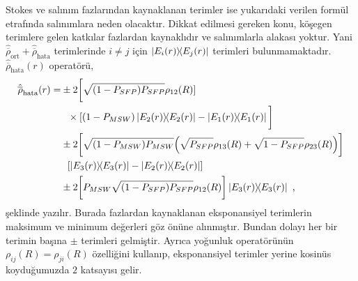 Stokes ve salınım fazlarından kaynaklanan terimler ise yukarıdaki verilen formül etrafında salınımlara neden olacaktır. Dikkat edilmesi gereken konu, köşegen terimlere gelen katkılar fazlardan kaynaklıdır ve salınımlarla alakası yoktur. Yani $ \hat{\overline{\rho}}_{\text{ort}}+ \hat{\overline{\rho}}_{\text{hata}} $ terimlerinde $ i \ne j$ için $ \dyad{E_{i}(r)}{E_{j}(r)} $ terimleri bulunmamaktadır. $ \hat{\overline{\rho}}_{\text{hata}}(r) $ operatörü,
\begin{align}\label{eqn:rhoBar_hata}
    \nonumber\hat{\overline{\rho}}_{\text{hata}}(r)=&\pm 2\bigg[\sqrt{(1-P_{SFP}) P_{SFP}}\rho_{12}(R)]\\
    \nonumber&~~\times[(1-P_{MSW})\dyad{E_{2}(r)}{E_{2}(r)} -\dyad{E_{1}(r)}{E_{1}(r)}\bigg]\\
    \nonumber&\pm 2\bigg[\sqrt{(1-P_{MSW})P_{MSW}}\qty(\sqrt{P_{SFP}}\rho_{13}(R)+\sqrt{1-P_{SFP}}\rho_{23}(R))\bigg]\\ \nonumber& ~~\qty[\dyad{E_{3}(r)}{E_{3}(r)} - \dyad{E_{2}(r)}{E_{2}(r)}]\\
    &\pm 2 \bigg[P_{MSW}\sqrt{(1-P_{SFP}) P_{SFP}} \rho_{12}(R)\bigg]\dyad{E_{3}(r)}{E_{3}(r)} \text{ ,}
\end{align}
şeklinde yazılır. Burada fazlardan kaynaklanan eksponansiyel terimlerin maksimum ve minimum değerleri göz önüne alınmıştır. Bundan dolayı her bir terimin başına $ \pm $ terimleri gelmiştir. Ayrıca yoğunluk operatörünün $ \rho_{ij}(R) = \rho_{ji}(R)$ özelliğini kullanıp, eksponansiyel terimler yerine kosinüs koyduğumuzda $ 2 $ katsayısı gelir.

